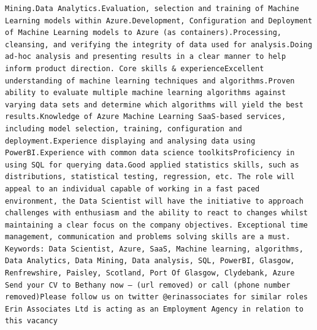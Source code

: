 \documentclass[
]{article}
\begin{document}
\begin{verbatim}
Mining.Data Analytics.Evaluation, selection and training of Machine Learning models within Azure.Development, Configuration and Deployment of Machine Learning models to Azure (as containers).Processing, cleansing, and verifying the integrity of data used for analysis.Doing ad-hoc analysis and presenting results in a clear manner to help inform product direction. Core skills & experienceExcellent understanding of machine learning techniques and algorithms.Proven ability to evaluate multiple machine learning algorithms against varying data sets and determine which algorithms will yield the best results.Knowledge of Azure Machine Learning SaaS-based services, including model selection, training, configuration and deployment.Experience displaying and analysing data using PowerBI.Experience with common data science toolkitsProficiency in using SQL for querying data.Good applied statistics skills, such as distributions, statistical testing, regression, etc. The role will appeal to an individual capable of working in a fast paced environment, the Data Scientist will have the initiative to approach challenges with enthusiasm and the ability to react to changes whilst maintaining a clear focus on the company objectives. Exceptional time management, communication and problems solving skills are a must. Keywords: Data Scientist, Azure, SaaS, Machine learning, algorithms, Data Analytics, Data Mining, Data analysis, SQL, PowerBI, Glasgow, Renfrewshire, Paisley, Scotland, Port Of Glasgow, Clydebank, Azure Send your CV to Bethany now – (url removed) or call (phone number removed)Please follow us on twitter @erinassociates for similar roles Erin Associates Ltd is acting as an Employment Agency in relation to this vacancy

\end{verbatim}
\end{document}
